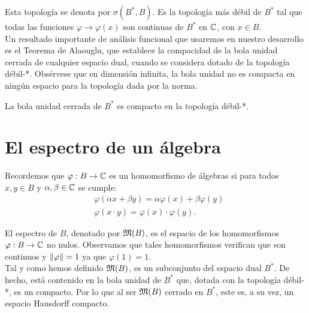 Esta topología se denota por $\sigma(B^*, B)$. Es la topología más débil de $B^*$ tal que todas las funciones $\varphi \to \varphi(x)$ son continuas de $B^*$ en $\mathbb{C}$, con $x \in B$. \\ %

Un resultado importante de análisis funcional que usaremos en nuestro desarrollo es el Teorema de Alaouglu, que establece la compacidad de la bola unidad cerrada de cualquier espacio dual, cuando se considera dotado de la topología débil-*. Obsérvese que en dimensión infinita, la bola unidad no es compacta en ningún espacio para la topología dada por la norma. \\

\begin{theorem}[de Alaouglu]
    La bola unidad cerrada de $B^*$ es compacto en la topología débil-*.
\end{theorem}

\section{El espectro de un álgebra}

Recordemos que $\varphi: B \to \mathbb{C}$ es un homomorfismo de álgebras si para todos $x, y \in B$ y $\alpha, \beta \in \mathbb{C}$ se cumple:
\begin{equation}
    \begin{split}
        & \varphi (\alpha x + \beta y) = \alpha \varphi(x) + \beta \varphi(y) \\
        & \varphi(x \cdot y) = \varphi(x) \cdot \varphi(y).
    \end{split}
\end{equation}

El espectro de $B$, denotado por $\mathfrak{M}(B)$, es el espacio de los homomorfismos $\varphi: B \to \mathbb{C}$ no nulos. Observamos que tales homomorfismos verifican que son continuos y $\left\lVert\varphi\right\rVert = 1$ ya que $\varphi(1) = 1$. \\ %

Tal y como hemos definido $\mathfrak{M}(B)$, es un subconjunto del espacio dual $B^*$. De hecho, está contenido en la bola unidad de $B^*$ que, dotada con la topología débil-*, es un compacto. Por lo que al ser $\mathfrak{M}(B)$ cerrado en $B^*$, este es, a su vez, un espacio Hausdorff compacto. \\


